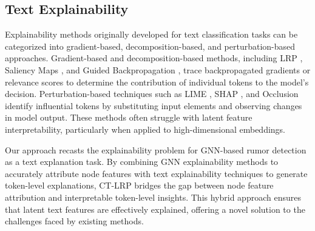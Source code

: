 
\subsection{Text Explainability}
Explainability methods originally developed for text classification tasks can be categorized into gradient-based, decomposition-based, and perturbation-based approaches. Gradient-based and decomposition-based methods, including LRP \cite{bach2015pixel}, Saliency Maps \cite{simonyan2013deep}, and Guided Backpropagation \cite{springenberg2014striving}, trace backpropagated gradients or relevance scores to determine the contribution of individual tokens to the model's decision. Perturbation-based techniques such as LIME \cite{ribeiro2016should}, SHAP \cite{lundberg2017unified}, and Occlusion \cite{zeiler2014visualizing} identify influential tokens by substituting input elements and observing changes in model output. These methods often struggle with latent feature interpretability, particularly when applied to high-dimensional embeddings.

Our approach recasts the explainability problem for GNN-based rumor detection as a text explanation task. By combining GNN explainability methods to accurately attribute node features with text explainability techniques to generate token-level explanations, CT-LRP bridges the gap between node feature attribution and interpretable token-level insights. This hybrid approach ensures that latent text features are effectively explained, offering a novel solution to the challenges faced by existing methods.



